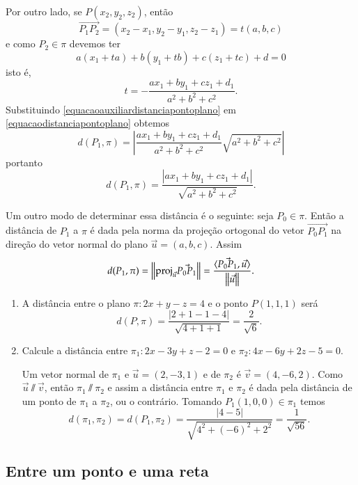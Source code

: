 Por outro lado, se $P(x_2, y_2, z_2)$, ent\~ao
\[
    \vec{P_1P_2} = (x_2 - x_1, y_2 - y_1, z_2 - z_1) = t(a,b,c)
\]
e como $P_2 \in \pi$ devemos ter
\[
    a(x_1 + ta) + b(y_1 + tb) + c(z_1 + tc) + d = 0
\]
isto \'e,
\begin{equation}\label{equacaoauxiliardistanciapontoplano}
    t = -\dfrac{ax_1 + by_1 + cz_1 + d_1}{a^2 + b^2 + c^2}.
\end{equation}
Substituindo \eqref{equacaoauxiliardistanciapontoplano} em \eqref{equacaodistanciapontoplano} obtemos
\[
    d(P_1,\pi) = \left|\dfrac{ax_1 + by_1 + cz_1 + d_1}{a^2 + b^2 + c^2}\sqrt{a^2 + b^2 + c^2}\right|
\]
portanto
\[
    d(P_1,\pi) = \dfrac{|ax_1 + by_1 + cz_1 + d_1|}{\sqrt{a^2 + b^2 + c^2}}.
\]

Um outro modo de determinar essa dist\^ancia \'e o seguinte: seja $P_0 \in \pi$. Ent\~ao a dist\^ancia de $P_1$ a $\pi$ \'e dada pela norma da proje\c{c}\~ao ortogonal do vetor $\vec{P_0P_1}$ na dire\c{c}\~ao do vetor normal do plano $\vec{u} = (a,b,c)$. Assim
\[
    d(P_1,\pi) = \left\Vert{{\rm proj}_{\vec{u}}\vec{P_0P_1}}\right\Vert = \dfrac{\langle\vec{P_0P_1},\vec{u}\rangle}{\left\Vert{\vec{u}}\right\Vert}.
\]

\begin{exemplos}
    \begin{enumerate}
        \item A dist\^ancia entre o plano $\pi: 2x + y - z = 4$ e o ponto $P(1,1,1)$ ser\'a
        \[
            d(P,\pi) = \dfrac{|2 + 1 - 1 - 4|}{\sqrt{4 + 1 + 1}} = \dfrac{2}{\sqrt{6}}.
        \]
        \item Calcule a dist\^ancia entre $\pi_1 : 2x - 3y + z - 2 = 0$ e $\pi_2 : 4x - 6y + 2z - 5 = 0$.
        \begin{solucao}
            Um vetor normal de $\pi_1$ e $\vec{u} = (2,-3,1)$ e de $\pi_2$ \'e $\vec{v} = (4,-6,2)$. Como $\vec{u}\varparallel\vec{v}$, ent\~ao $\pi_1\varparallel\pi_2$ e assim a dist\^ancia entre $\pi_1$ e $\pi_2$ \'e dada pela dist\^ancia de um ponto de $\pi_1$ a $\pi_2$, ou o contr\'ario. Tomando $P_1(1,0,0)\in\pi_1$ temos
            \[
                d(\pi_1,\pi_2) = d(P_1,\pi_2) = \dfrac{|4-5|}{\sqrt{4^2 + (-6)^2 + 2^2}} = \dfrac{1}{\sqrt{56}}.
            \]
        \end{solucao}
    \end{enumerate}
\end{exemplos}


\subsection{Entre um ponto e uma reta} %
\label{sub:entre_um_ponto_e_uma_reta}

